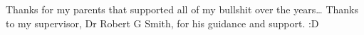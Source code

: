 \documentclass[
11pt, %
english, %
singlespacing, %
headsepline, %
]{style} %
\begin{document}
\begin{abstract}

\end{abstract}


\begin{acknowledgements}
	\addchaptertocentry{\acknowledgementname} %
	Thanks for my parents that supported all of my bullshit over the years\ldots
	\linebreak
	\linebreak
	Thanks to my supervisor, Dr Robert G Smith, for his guidance and support.
	\linebreak
	\linebreak
	:D
\end{acknowledgements}


\tableofcontents %

\listoffigures %

\listoftables %

\end{document}
